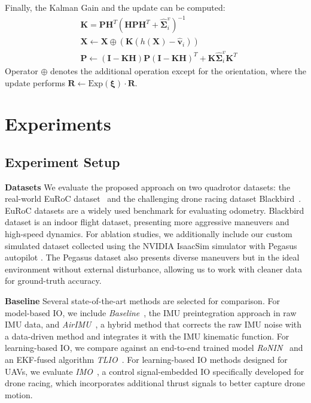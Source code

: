 Finally, the Kalman Gain and the update can be computed:
\begin{equation}
    \begin{split}
    &\mathbf{K} = \mathbf{P} \mathbf{H}^T(\mathbf{HPH}^{T} + \hat{\boldsymbol{\Sigma}}^{v}_{i} )^{-1} \\
    &\mathbf{X} \leftarrow \mathbf{X} \oplus (\mathbf{K}(h(\mathbf{X}) -  \hat{\mathbf{v}}_i)) \\
    &\mathbf{P} \leftarrow (\mathbf{I} - \mathbf{KH})\mathbf{P}(\mathbf{I}-\mathbf{KH})^T + \mathbf{K}  \hat{\boldsymbol{ \Sigma}}^v_i \mathbf{K}^T
    \end{split}
\end{equation}
Operator $\oplus$ denotes the additional operation except for the orientation, where the update performs $\mathbf{R} \leftarrow \text{Exp} (\boldsymbol{\xi}) \cdot \mathbf{R}$.


\section{Experiments}
\label{sec:airio:experiments}

\subsection{Experiment Setup}

\noindent\textbf{Datasets} We evaluate the proposed approach on two quadrotor datasets: the real-world EuRoC dataset~\cite{burri2016euroc} and the challenging drone racing dataset Blackbird~\cite{antonini2018blackbird}. EuRoC datasets are a widely used benchmark for evaluating odometry.
Blackbird dataset is an indoor flight dataset, presenting more aggressive maneuvers and high-speed dynamics.
For ablation studies, we additionally include our custom simulated dataset collected using the NVIDIA IsaacSim simulator with Pegasus autopilot \cite{Jacinto2024pegasus}.
The Pegasus dataset also presents diverse maneuvers but in the ideal environment without external disturbance, allowing us to work with cleaner data for ground-truth accuracy.

\noindent\textbf{Baseline} Several state-of-the-art methods are selected for comparison. For model-based IO, we include \textit{Baseline}~\cite{forster2015imu}, the IMU preintegration approach in raw IMU data, and \textit{AirIMU}~\cite{qiu2023airimu}, a hybrid method that corrects the raw IMU noise with a data-driven method and integrates it with the IMU kinematic function.
For learning-based IO, we compare against an end-to-end trained model \textit{RoNIN}~\cite{herath2020ronin} and an EKF-fused algorithm \textit{TLIO}~\cite{liu2020tlio}.
For learning-based IO methods designed for UAVs, we evaluate \textit{IMO}~\cite{CioffiRal2023}, a control signal-embedded IO specifically developed for drone racing, which incorporates additional thrust signals to better capture drone motion.

